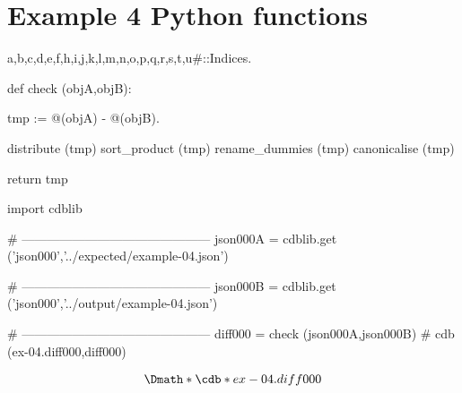 \documentclass[12pt]{cdblatex}
\begin{document}
\section*{Example 4 Python functions}

\begin{cadabra}
   {a,b,c,d,e,f,h,i,j,k,l,m,n,o,p,q,r,s,t,u#}::Indices.

   def check (objA,objB):

       tmp := @(objA) - @(objB).

       distribute     (tmp)
       sort_product   (tmp)
       rename_dummies (tmp)
       canonicalise   (tmp)

       return tmp

   import cdblib

   # ---------------------------------------------
   json000A = cdblib.get ('json000','../expected/example-04.json')

   # ---------------------------------------------
   json000B = cdblib.get ('json000','../output/example-04.json')

   # ---------------------------------------------
   diff000 = check (json000A,json000B)   # cdb (ex-04.diff000,diff000)

\end{cadabra}

\clearpage

\begin{dgroup*}
   \Dmath*{\cdb*{ex-04.diff000}}
\end{dgroup*}
\end{document}
